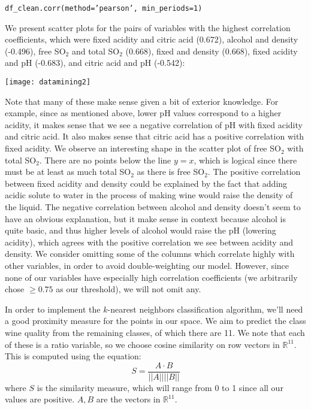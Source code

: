 \documentclass[11pt,oneside,reqno]{amsart}
\theoremstyle{plain}
\theoremstyle{definition}
\theoremstyle{remark}
\newcommand{\fracc}{\frac}
\newcommand{\inlinecode}{\texttt}
\begin{document}
\begin{center}
\inlinecode{df\_clean.corr(method='pearson', min\_periods=1)}
\end{center}
We present scatter plots for the pairs of variables with the highest correlation coefficients, which were fixed acidity and citric acid (0.672), alcohol and density (-0.496), free SO$_2$ and total SO$_2$ (0.668), fixed and density (0.668), fixed acidity and pH (-0.683), and citric acid and pH (-0.542):
\begin{adjustbox}{center}
\texttt{[image: datamining2]}
\end{adjustbox}
Note that many of these make sense given a bit of exterior knowledge. For example, since as mentioned above, lower pH values correspond to a higher acidity, it makes sense that we see a negative correlation of pH with fixed acidity and citric acid. It also makes sense that citric acid has a positive correlation with fixed acidity. We observe an interesting shape in the scatter plot of free SO$_2$ with total SO$_2$. There are no points below the line $y = x$, which is logical since there must be at least as much total SO$_2$ as there is free SO$_2$. The positive correlation between fixed acidity and density could be explained by the fact that adding acidic solute to water in the process of making wine would raise the density of the liquid. The negative correlation between alcohol and density doesn't seem to have an obvious explanation, but it make sense in context because alcohol is quite basic, and thus higher levels of alcohol would raise the pH (lowering acidity), which agrees with the positive correlation we see between acidity and density. We consider omitting some of the columns which correlate highly with other variables, in order to avoid double-weighting our model. However, since none of our variables have especially high correlation coefficients (we arbitrarily chose $\geq 0.75$ as our threshold), we will not omit any. 

In order to implement the $k$-nearest neighbors classification algorithm, we'll need a good proximity measure for the points in our space. We aim to predict the class wine quality from the remaining classes, of which there are 11. We note that each of these is a ratio variable, so we choose cosine similarity on row vectors in $\mathbb{R}^{11}$. This is computed using the equation:
$$
S = \fracc{A \cdot B}{||A||||B||}
$$
where $S$ is the similarity measure, which will range from 0 to 1 since all our values are positive. $A,B$ are the vectors in $\mathbb{R}^{11}$. 
\end{document}
